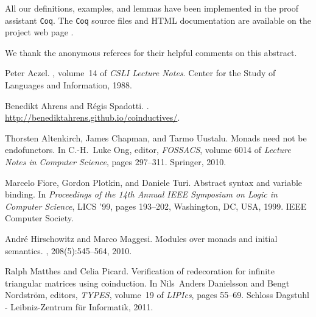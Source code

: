 \documentclass{easychair}
\newcommand{\coq}{\texttt{Coq}\xspace}
\begin{document}
 All our definitions, examples, and lemmas have been implemented in the proof assistant \coq. %
 The \coq source files and HTML documentation are available on the project web page \cite{trimat_coq}.


 
We thank the anonymous referees for their helpful comments on this abstract.



\begin{thebibliography}{1}

Peter Aczel.
, volume~14 of {\em CSLI Lecture Notes}.
\newblock Center for the Study of Languages and Information, 1988.

Benedikt Ahrens and R\'egis Spadotti.
.
\newblock \url{http://benediktahrens.github.io/coinductives/}.

Thorsten Altenkirch, James Chapman, and Tarmo Uustalu.
\newblock Monads need not be endofunctors.
\newblock In C.-H.~Luke Ong, editor, {\em FOSSACS}, volume 6014 of {\em Lecture
  Notes in Computer Science}, pages 297--311. Springer, 2010.

Marcelo Fiore, Gordon Plotkin, and Daniele Turi.
\newblock Abstract syntax and variable binding.
\newblock In {\em Proceedings of the 14th Annual IEEE Symposium on Logic in
  Computer Science}, LICS '99, pages 193--202, Washington, DC, USA, 1999. IEEE
  Computer Society.

Andr{\'e} Hirschowitz and Marco Maggesi.
\newblock Modules over monads and initial semantics.
, 208(5):545--564, 2010.

Ralph Matthes and Celia Picard.
\newblock Verification of redecoration for infinite triangular matrices using
  coinduction.
\newblock In Nils~Anders Danielsson and Bengt Nordstr{\"o}m, editors, {\em
  TYPES}, volume~19 of {\em LIPIcs}, pages 55--69. Schloss Dagstuhl -
  Leibniz-Zentrum f\"ur Informatik, 2011.

\end{thebibliography}
\end{document}
